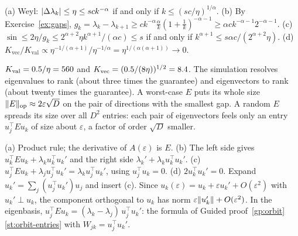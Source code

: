 (a) Weyl: $\lvert\Delta\lambda_k\rvert\le\eta\le sck^{-\alpha}$ if and only if $k\le(sc/\eta)^{1/\alpha}$.
\newline (b) By Exercise~\ref{ex:gaps}, $g_k=\lambda_k-\lambda_{k+1}\ge ck^{-\alpha}\frac\alpha k(1+\frac1k)^{-\alpha-1}\ge\alpha ck^{-\alpha-1}2^{-\alpha-1}$.
\newline (c) $\sin\le2\eta/g_k\le2^{\alpha+2}\eta k^{\alpha+1}/(\alpha c)\le s$ if and only if $k^{\alpha+1}\le s\alpha c/(2^{\alpha+2}\eta)$.
\newline (d) $K_{\text{vec}}/K_{\text{val}}\propto\eta^{-1/(\alpha+1)}/\eta^{-1/\alpha}=\eta^{1/(\alpha(\alpha+1))}\to0$.

$K_{\text{val}}=0.5/\eta=560$ and $K_{\text{vec}}=(0.5/(8\eta))^{1/2}=8.4$. The simulation resolves
eigenvalues to rank \NumKvalSim{} (about three times the guarantee) and eigenvectors to rank \NumKvecSim{} (about
twenty times the guarantee). A worst-case $E$ puts its whole size $\lVert E\rVert_{\mathrm{op}}\approx2\varepsilon\sqrt D$ on the
pair of directions with the smallest gap. A random $E$ spreads its size over all $D^2$ entries: each pair of
eigenvectors feels only an entry $u_j^\top Eu_k$ of size about $\varepsilon$, a factor of order $\sqrt D$ smaller.

(a) Product rule; the derivative of $A(\varepsilon)$ is $E$.
\newline (b) The left side gives $u_k^\top Eu_k+\lambda_ku_k^\top u_k'$ and the right side $\lambda_k'+\lambda_ku_k^\top u_k'$.
\newline (c) $u_j^\top Eu_k+\lambda_ju_j^\top u_k'=\lambda_ku_j^\top u_k'$, using $u_j^\top u_k=0$.
\newline (d) $2u_k^\top u_k'=0$. Expand $u_k'=\sum_j(u_j^\top u_k')u_j$ and insert (c). Since
$u_k(\varepsilon)=u_k+\varepsilon u_k'+O(\varepsilon^2)$ with $u_k'\perp u_k$, the component orthogonal to $u_k$ has
norm $\varepsilon\lVert u_k'\rVert+O(\varepsilon^2)$. In the eigenbasis, $u_j^\top Eu_k=(\lambda_k-\lambda_j)\,u_j^\top u_k'$:
the formula of Guided proof~\ref{gp:orbit}\ref{st:orbit-entries} with $W_{jk}=u_j^\top u_k'$.

